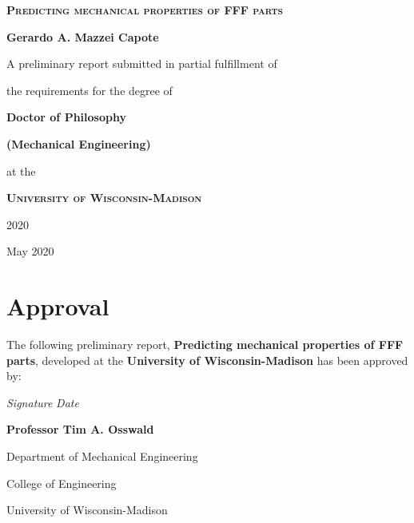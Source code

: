 \documentclass[main.tex]{subfiles}
\begin{document}
\begin{titlepage}
	\begin{center}
		\vspace{1cm}
		{\scshape\Huge\textbf{Predicting mechanical properties of FFF parts} \par}
		\vspace{1cm}
		{\LARGE\textbf{Gerardo A. Mazzei Capote} \par}
		\vspace{1cm}
		{\Large A preliminary report submitted in partial fulfillment of \par 
				the requirements for the degree of \par}
		\vspace{1cm}
		{\LARGE\textbf{Doctor of Philosophy} \par}
		{\LARGE\textbf{(Mechanical Engineering)} \par}
		\vspace{1cm}
		{\Large at the \par}
		\vspace{0.5cm}
		{\scshape\LARGE\textbf{ University of Wisconsin-Madison} \par}
		\vspace{0.5cm}
		{\Large 2020 \par}
		\vfill
		{\large May 2020}		%
	\end{center}
\end{titlepage}

\pagestyle{empty}
\cleardoublepage
\setcounter{page}{1}

\chapter*{Approval}
The following preliminary report, \textbf{Predicting mechanical properties of FFF parts}, developed at the \textbf{University of Wisconsin-Madison}
has been approved by:
\vspace{2cm}

\noindent
\makebox[7cm]{\hrulefill} \hfill\makebox[4cm]{\hrulefill}
\par\noindent
\textit{Signature} \hfill\textit{Date}\hspace{3cm}
\vspace{5 mm}
\par\noindent
\textbf{Professor Tim A. Osswald}
\par\noindent Department of Mechanical Engineering
\par\noindent College of Engineering
\par\noindent University of Wisconsin-Madison

\cleardoublepage
\end{document}
